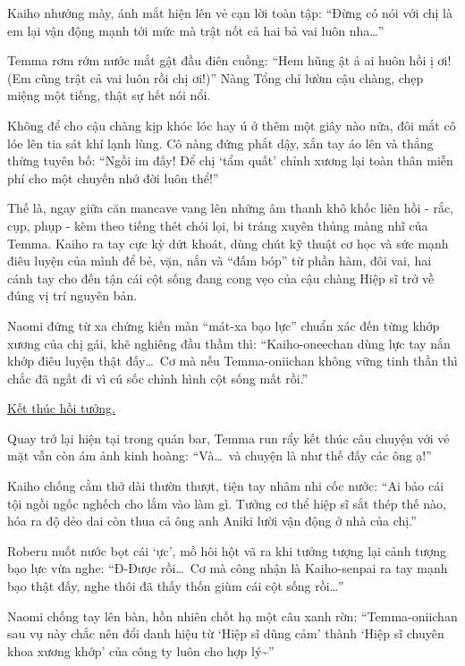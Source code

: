 \documentclass[../main.tex]{subfiles}
\begin{document}

Kaiho nhướng mày, ánh mắt hiện lên vẻ cạn lời toàn tập: ``Đừng có nói với chị là em lại vận động mạnh tới mức mà trật nốt cả hai bả vai luôn nha\dots''

Temma rơm rớm nước mắt gật đầu điên cuồng: ``Hem hũng ật ả ai huôn hồi ị ơi! (Em cũng trật cả vai luôn rồi chị ơi!)'' Nàng Tổng chỉ lườm cậu chàng, chẹp miệng một tiếng, thật sự hết nói nổi.

Không để cho cậu chàng kịp khóc lóc hay ú ớ thêm một giây nào nữa, đôi mắt cô lóe lên tia sát khí lạnh lùng. Cô nàng đứng phắt dậy, xắn tay áo lên và thẳng thừng tuyên bố: ``Ngồi im đấy! Để chị `tẩm quất' chỉnh xương lại toàn thân miễn phí cho một chuyến nhớ đời luôn thể!''

Thế là, ngay giữa căn mancave vang lên những âm thanh khô khốc liên hồi - rắc, cụp, phụp - kèm theo tiếng thét chói lọi, bi tráng xuyên thủng màng nhĩ của Temma. Kaiho ra tay cực kỳ dứt khoát, dùng chút kỹ thuật cơ học và sức mạnh điêu luyện của mình để bẻ, vặn, nắn và ``đấm bóp'' từ phần hàm, đôi vai, hai cánh tay cho đến tận cái cột sống đang cong vẹo của cậu chàng Hiệp sĩ trở về đúng vị trí nguyên bản.

Naomi đứng từ xa chứng kiến màn ``mát-xa bạo lực'' chuẩn xác đến từng khớp xương của chị gái, khẽ nghiêng đầu thầm thì: ``Kaiho-oneechan dùng lực tay nắn khớp điêu luyện thật đấy\dots\ Cơ mà nếu Temma-oniichan không vững tinh thần thì chắc đã ngất đi vì cú sốc chỉnh hình cột sống mất rồi.''

\begin{center}
    \uline{Kết thúc hồi tưởng.}
\end{center}

Quay trở lại hiện tại trong quán bar, Temma run rẩy kết thúc câu chuyện với vẻ mặt vẫn còn ám ảnh kinh hoàng: ``Và\dots\ và chuyện là như thế đấy các ông ạ!''

Kaiho chống cằm thở dài thườn thượt, tiện tay nhâm nhi cốc nước: ``Ai bảo cái tội ngồi ngốc nghếch cho lắm vào làm gì. Tưởng cơ thể hiệp sĩ sắt thép thế nào, hóa ra độ dẻo dai còn thua cả ông anh Aniki lười vận động ở nhà của chị.''

Roberu nuốt nước bọt cái `ực', mồ hôi hột vã ra khi tưởng tượng lại cảnh tượng bạo lực vừa nghe: ``Đ-Được rồi\dots\ Cơ mà công nhận là Kaiho-senpai ra tay mạnh bạo thật đấy, nghe thôi đã thấy thốn giùm cái cột sống rồi\dots''

Naomi chống tay lên bàn, hồn nhiên chốt hạ một câu xanh rờn: ``Temma-oniichan sau vụ này chắc nên đổi danh hiệu từ `Hiệp sĩ dũng cảm' thành `Hiệp sĩ chuyên khoa xương khớp' của công ty luôn cho hợp lý\~{}''
\end{document}
